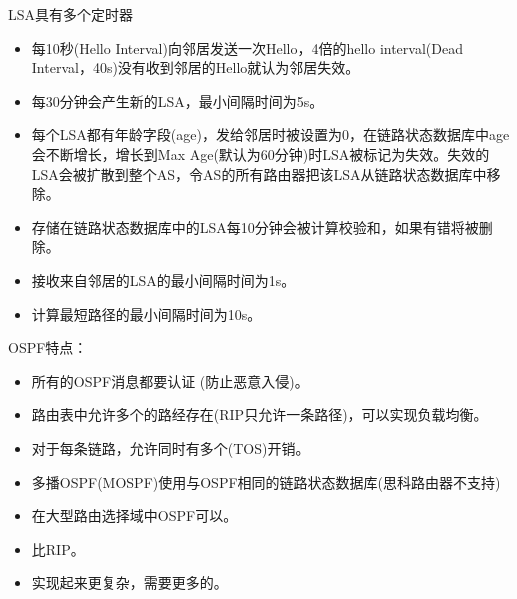 \myhline
LSA具有多个定时器
\begin{itemize}
	\item 每10秒(Hello Interval)向邻居发送一次Hello，4倍的hello interval(Dead Interval，40s)没有收到邻居的Hello就认为邻居失效。
	\item 每30分钟会产生新的LSA，最小间隔时间为5s。
	\item 每个LSA都有年龄字段(age)，发给邻居时被设置为0，在链路状态数据库中age会不断增长，增长到Max Age(默认为60分钟)时LSA被标记为失效。失效的LSA会被扩散到整个AS，令AS的所有路由器把该LSA从链路状态数据库中移除。
	\item 存储在链路状态数据库中的LSA每10分钟会被计算校验和，如果有错将被删除。
	\item 接收来自邻居的LSA的最小间隔时间为1s。
	\item 计算最短路径的最小间隔时间为10s。
\end{itemize}

\myhline
OSPF特点：
\begin{itemize}
	\item 所有的OSPF消息都要认证 (防止恶意入侵)。
	\item 路由表中允许多个的路经存在(RIP只允许一条路径)，可以实现负载均衡。
	\item 对于每条链路，允许同时有多个(TOS)开销。
	\item 多播OSPF(MOSPF)使用与OSPF相同的链路状态数据库(思科路由器不支持)
	\item 在大型路由选择域中OSPF可以。
	\item 比RIP。
	\item 实现起来更复杂，需要更多的。
\end{itemize}

